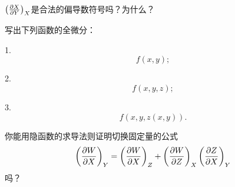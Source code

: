 \documentclass[CJK]{beamer}
\begin{document}
\begin{frame}
\bch


$\left(\frac{\partial X}{\partial Y}\right)_{X}$是合法的偏导数符号吗？为什么？

\ech
\end{frame}


\begin{frame}
\bch


写出下列函数的全微分：
\bitem
\item[1.]{ $$f(x,y);$$}
\item[2.]{ $$f(x,y, z);$$}  
\item[3.]{$$f(x, y, z(x,y)). $$}
\eitem


\ech
\end{frame}



\begin{frame}
\bch


你能用隐函数的求导法则证明切换固定量的公式
      $$ \left(\frac{\partial W}{\partial X}\right)_{Y} = \left(\frac{\partial W}{\partial X}\right)_{Z} + \left(\frac{\partial W}{\partial Z}\right)_{X} \left(\frac{\partial Z}{\partial X}\right)_{Y}$$
吗？
\ech
\end{frame}
\end{document}
